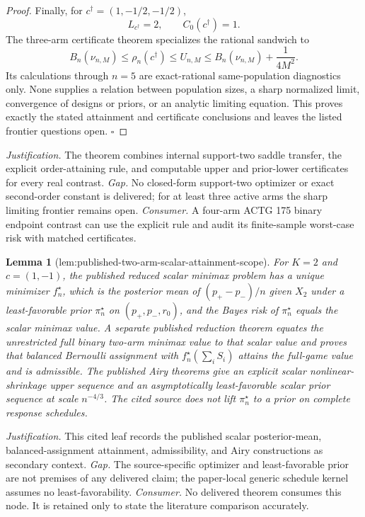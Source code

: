 \documentclass{article}
\newtheorem{lemma}{Lemma}
\begin{document}
\begin{proof}
Finally, for \(c^\dagger=(1,-1/2,-1/2)\),
\[
 L_{c^\dagger}=2,
 \qquad C_0(c^\dagger)=1.
\]
The three-arm certificate theorem specializes the rational sandwich to
\[
 B_n(\nu_{n,M})\leq\rho_n(c^\dagger)\leq U_{n,M}
 \leq B_n(\nu_{n,M})+\frac1{4M^2}.
\]
Its calculations through \(n=5\) are exact-rational same-population diagnostics only. None supplies a relation between population sizes, a sharp normalized limit, convergence of designs or priors, or an analytic limiting equation. This proves exactly the stated attainment and certificate conclusions and leaves the listed frontier questions open. \(\square\)
\end{proof}
\par\smallskip\noindent \textit{Justification.} The theorem combines internal support-two saddle transfer, the explicit order-attaining rule, and computable upper and prior-lower certificates for every real contrast. \textit{Gap.} No closed-form support-two optimizer or exact second-order constant is delivered; for at least three active arms the sharp limiting frontier remains open. \textit{Consumer.} A four-arm ACTG 175 binary endpoint contrast can use the explicit rule and audit its finite-sample worst-case risk with matched certificates.

\begin{lemma}[lem:published-two-arm-scalar-attainment-scope]\label{lem:published-two-arm-scalar-attainment-scope}
For \(K=2\) and \(c=(1,-1)\), the published reduced scalar minimax problem has a unique minimizer \(f_n^\star\), which is the posterior mean of \((p_+-p_-)/n\) given \(X_2\) under a least-favorable prior \(\pi_n^\star\) on \((p_+,p_-,r_0)\), and the Bayes risk of \(\pi_n^\star\) equals the scalar minimax value. A separate published reduction theorem equates the unrestricted full binary two-arm minimax value to that scalar value and proves that balanced Bernoulli assignment with \(f_n^\star(\sum_i S_i)\) attains the full-game value and is admissible. The published Airy theorems give an explicit scalar nonlinear-shrinkage upper sequence and an asymptotically least-favorable scalar prior sequence at scale \(n^{-4/3}\). The cited source does not lift \(\pi_n^\star\) to a prior on complete response schedules.
\end{lemma}
\par\smallskip\noindent \textit{Justification.} This cited leaf records the published scalar posterior-mean, balanced-assignment attainment, admissibility, and Airy constructions as secondary context. \textit{Gap.} The source-specific optimizer and least-favorable prior are not premises of any delivered claim; the paper-local generic schedule kernel assumes no least-favorability. \textit{Consumer.} No delivered theorem consumes this node. It is retained only to state the literature comparison accurately.
\end{document}
